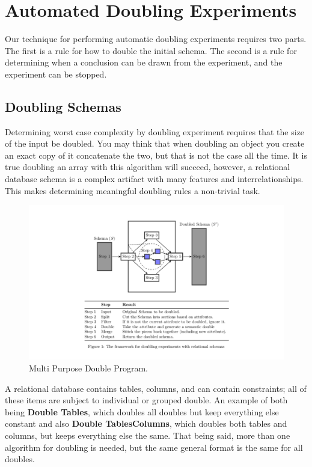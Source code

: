 \section{Automated Doubling Experiments}
  \label{sec:technique}

  Our technique for performing automatic doubling experiments requires
  two parts.  The first is a rule for how to double the initial schema.
  The second is a rule for determining when a conclusion can be drawn
  from the experiment, and the experiment can be stopped. 

  \subsection{Doubling Schemas}
  \label{subsec:doubling}

  Determining worst case complexity by doubling experiment requires that
  the size of the input be doubled. You may think that when doubling an
  object you create an exact copy of it concatenate the two, but that
  is not the case all the time. It is true doubling an array
  with this algorithm will succeed, however, a relational database
  schema is a complex artifact with many features and interrelationships. 
  This makes determining meaningful doubling rules a non-trivial task.

  \begin{figure}
    \centering
    \centering
    \includegraphics[width=1.25\linewidth]{../diagrams/genDouble}
    \caption{Multi Purpose Double Program.}
    \label{fig:generaldouble}
  \end{figure}

  A relational database contains tables, columns, and can contain constraints; 
  all of these items are subject to individual or grouped double. An example of
  both being \textbf{Double Tables}, which doubles all doubles but keep
  everything else constant and also \textbf{Double TablesColumns}, which
  doubles both tables and columns, but keeps everything else the same. That 
  being said, more than one algorithm for doubling is needed, but the same 
  general format is the same for all doubles.

